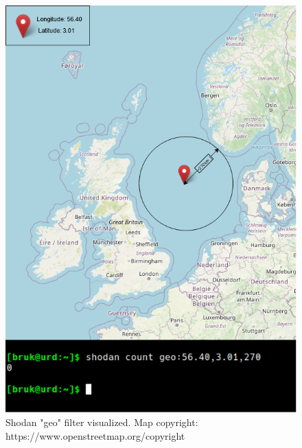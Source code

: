 \begin{figure} [H]
    \centering
    \includegraphics[scale=0.7]{Figurer/geolocation.png}
    \caption{Shodan "geo" filter visualized. Map copyright: https://www.openstreetmap.org/copyright}
    \label{fig:geolocation}
\end{figure}

